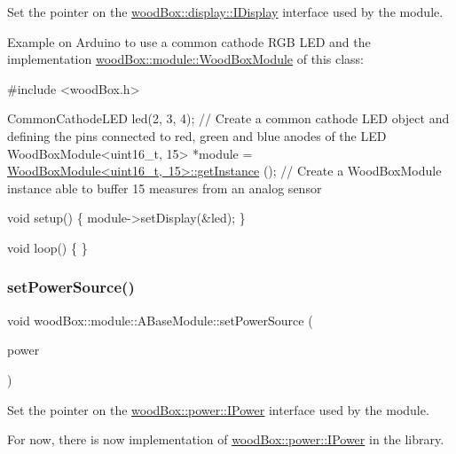 Set the pointer on the \mbox{\hyperlink{classwood_box_1_1display_1_1_i_display}{wood\+Box\+::display\+::\+I\+Display}} interface used by the module.

Example on Arduino to use a common cathode R\+GB L\+ED and the implementation \mbox{\hyperlink{classwood_box_1_1module_1_1_wood_box_module}{wood\+Box\+::module\+::\+Wood\+Box\+Module}} of this class\+:


\begin{DoxyCode}
\textcolor{preprocessor}{#include <woodBox.h>}

CommonCathodeLED led(2, 3, 4); \textcolor{comment}{// Create a common cathode LED object and defining the pins connected to
       red, green and blue anodes of the LED}
WoodBoxModule<uint16\_t, 15> *module = \mbox{\hyperlink{classwood_box_1_1module_1_1_wood_box_module_a3f13bd3a6318ddf2a7db84f86b198a49}{WoodBoxModule<uint16\_t, 15>::getInstance}}
      (); \textcolor{comment}{// Create a WoodBoxModule instance able to buffer 15 measures from an analog sensor}

\textcolor{keywordtype}{void} setup() \{
  module->setDisplay(&led);
\}

\textcolor{keywordtype}{void} loop() \{
\}
\end{DoxyCode}
 \mbox{\label{classwood_box_1_1module_1_1_a_base_module_a117ce9fbbcef048ccde38f0b6a11aa91}} 
\subsubsection{\texorpdfstring{set\+Power\+Source()}{setPowerSource()}}
{\footnotesize\ttfamily void wood\+Box\+::module\+::\+A\+Base\+Module\+::set\+Power\+Source (\begin{DoxyParamCaption}\item[{\mbox{\hyperlink{classwood_box_1_1power_1_1_i_power}{power\+::\+I\+Power}} $\ast$}]{power }\end{DoxyParamCaption})}

Set the pointer on the \mbox{\hyperlink{classwood_box_1_1power_1_1_i_power}{wood\+Box\+::power\+::\+I\+Power}} interface used by the module.

For now, there is now implementation of \mbox{\hyperlink{classwood_box_1_1power_1_1_i_power}{wood\+Box\+::power\+::\+I\+Power}} in the library. \mbox{\label{classwood_box_1_1module_1_1_a_base_module_ac3fd88feae532ca88b14642f76ef8def}} 
